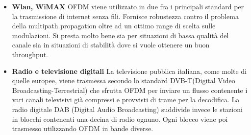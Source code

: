\begin{itemize}
\begin{itemize}
\end{itemize}
\begin{itemize}
	\item \textbf{Wlan, WiMAX}
	  OFDM viene utilizzato in due fra i principali standard per la trasmissione di internet senza fili. Fornisce robustezza contro il problema della multipath propagation oltre ad un ottimo range di scelta sulle modulazioni. Si presta molto bene sia per situazioni di bassa qualità del canale sia in situazioni di stabilità dove si vuole ottenere un buon throughput.
\end{itemize}
\begin{itemize}
	\item \textbf{Radio e televisione digitali} La televisione pubblica italiana, come molte di quelle europee, viene trasmessa secondo lo standard DVB-T(Digital Video Broadcasting-Terrestrial) che sfrutta OFDM per inviare un flusso contenente i vari canali televisivi già compressi e provvisti di trame per la decodifica. La radio digitale DAB (Digital Audio Broadcasting) suddivide invece le stazioni in blocchi contenenti una decina di radio ognuno. Ogni blocco viene poi trasmesso utilizzando OFDM in bande diverse.
\end{itemize}


\end{itemize}
